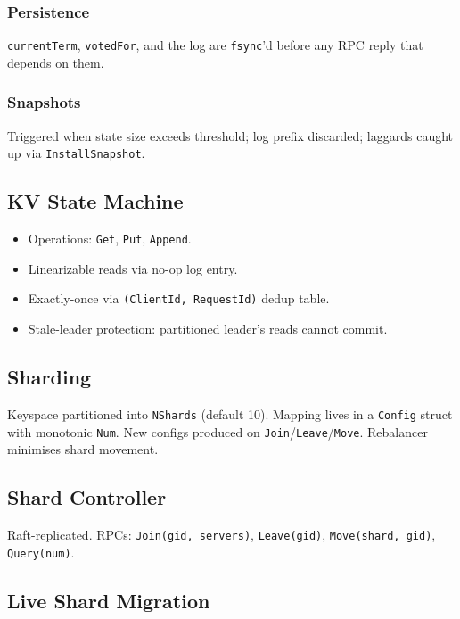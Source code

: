 \documentclass[11pt,a4paper]{article}
\begin{document}
\subsubsection{Persistence}
\texttt{currentTerm}, \texttt{votedFor}, and the log are \texttt{fsync}'d before any RPC reply that depends on them.

\subsubsection{Snapshots}
Triggered when state size exceeds threshold; log prefix discarded; laggards caught up via \texttt{InstallSnapshot}.

\subsection{KV State Machine}

\begin{itemize}[leftmargin=1.5em,itemsep=0.15em]
  \item Operations: \texttt{Get}, \texttt{Put}, \texttt{Append}.
  \item Linearizable reads via no-op log entry.
  \item Exactly-once via \texttt{(ClientId, RequestId)} dedup table.
  \item Stale-leader protection: partitioned leader's reads cannot commit.
\end{itemize}

\subsection{Sharding}

Keyspace partitioned into \texttt{NShards} (default 10). Mapping lives in a \texttt{Config} struct with monotonic \texttt{Num}. New configs produced on \texttt{Join}/\texttt{Leave}/\texttt{Move}. Rebalancer minimises shard movement.

\subsection{Shard Controller}

Raft-replicated. RPCs: \texttt{Join(gid, servers)}, \texttt{Leave(gid)}, \texttt{Move(shard, gid)}, \texttt{Query(num)}.

\subsection{Live Shard Migration}
\end{document}
